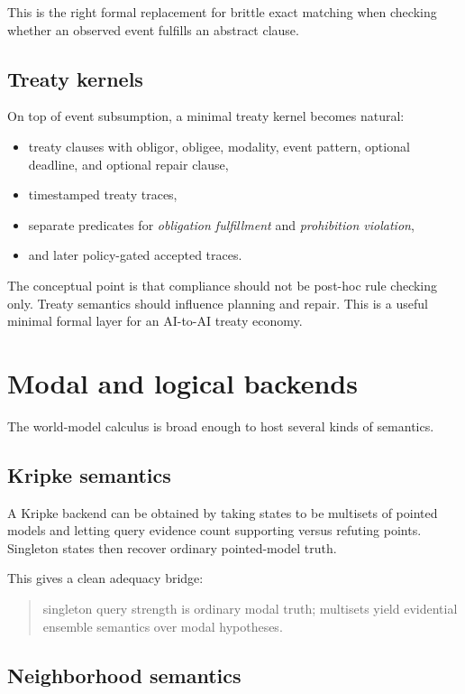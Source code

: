 \documentclass[11pt]{article}
\begin{document}
This is the right formal replacement for brittle exact matching when checking
whether an observed event fulfills an abstract clause.

\subsection{Treaty kernels}

On top of event subsumption, a minimal treaty kernel becomes natural:
\begin{itemize}
  \item treaty clauses with obligor, obligee, modality, event pattern,
        optional deadline, and optional repair clause,
  \item timestamped treaty traces,
  \item separate predicates for \emph{obligation fulfillment} and
        \emph{prohibition violation},
  \item and later policy-gated accepted traces.
\end{itemize}

The conceptual point is that compliance should not be post-hoc rule checking
only.  Treaty semantics should influence planning and repair.  This is a useful
minimal formal layer for an AI-to-AI treaty economy.

\section{Modal and logical backends}

The world-model calculus is broad enough to host several kinds of semantics.

\subsection{Kripke semantics}

A Kripke backend can be obtained by taking states to be multisets of pointed
models and letting query evidence count supporting versus refuting points.
Singleton states then recover ordinary pointed-model truth.

This gives a clean adequacy bridge:
\begin{quote}
singleton query strength is ordinary modal truth;
multisets yield evidential ensemble semantics over modal hypotheses.
\end{quote}

\subsection{Neighborhood semantics}
\end{document}
